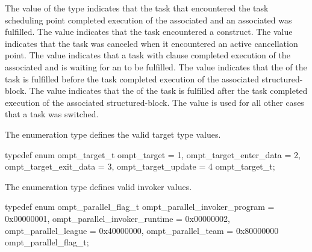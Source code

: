 \descr
The value  of the  type  indicates 
that the task that encountered the task scheduling point completed execution of the 
associated  and an associated 
was fulfilled. 
The value  indicates that the task encountered a  
construct. 
The value  indicates that the task was canceled when it 
encountered an active cancellation point. 
The value  indicates that a task with  clause 
completed execution of the associated  and is waiting for 
an  to be fulfilled. 
The value  indicates that the 
 of the task is fulfilled before the task
completed execution of the associated structured-block.
The value  indicates that the 
 of the task is fulfilled after the task
completed execution of the associated structured-block.
The value  is used for all other cases that a task was switched.

\label{sec:ompt_target_t}

\summary
The  enumeration type defines the valid target type values.

\format
\begin{ccppspecific}
\begin{omptEnum}
typedef enum ompt_target_t {
  ompt_target                         = 1,
  ompt_target_enter_data              = 2,
  ompt_target_exit_data               = 3,
  ompt_target_update                  = 4
} ompt_target_t;
\end{omptEnum}
\end{ccppspecific}



\label{sec:ompt_parallel_flag_t}

\summary
The  enumeration type defines valid invoker values.

\format
\begin{ccppspecific}
\begin{omptEnum}
typedef enum ompt_parallel_flag_t {
  ompt_parallel_invoker_program = 0x00000001,
  ompt_parallel_invoker_runtime = 0x00000002,
  ompt_parallel_league          = 0x40000000,
  ompt_parallel_team            = 0x80000000
} ompt_parallel_flag_t;
\end{omptEnum}
\end{ccppspecific}

